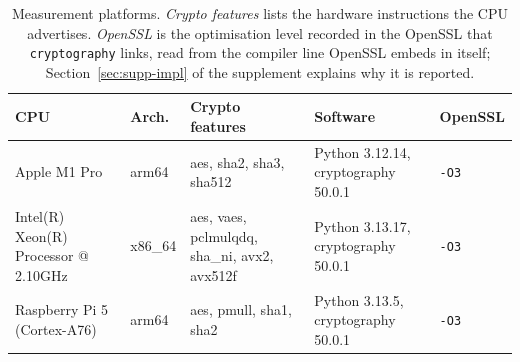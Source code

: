 \begin{table}[t]
\caption{Measurement platforms. \emph{Crypto features} lists the hardware instructions the CPU advertises. \emph{OpenSSL} is the optimisation level recorded in the OpenSSL that \texttt{cryptography} links, read from the compiler line OpenSSL embeds in itself; Section~\ref{sec:supp-impl} of the supplement explains why it is reported.}
\label{tab:platforms}
\small
\begin{tabular}{p{3.4cm}lp{2.6cm}p{3.2cm}l}
\toprule
CPU & Arch. & Crypto features & Software & OpenSSL\\
\midrule
Apple M1 Pro & arm64 & aes, sha2, sha3, sha512 & Python 3.12.14, cryptography 50.0.1 & \texttt{-O3}\\
Intel(R) Xeon(R) Processor @ 2.10GHz & x86\_64 & aes, vaes, pclmulqdq, sha\_ni, avx2, avx512f & Python 3.13.17, cryptography 50.0.1 & \texttt{-O3}\\
Raspberry Pi 5 (Cortex-A76) & arm64 & aes, pmull, sha1, sha2 & Python 3.13.5, cryptography 50.0.1 & \texttt{-O3}\\
\bottomrule
\end{tabular}
\end{table}
